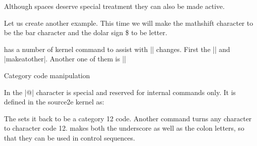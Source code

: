 Although spaces deserve special treatment they can also be made active.


Let us create another example. This time we will make the mathshift character to be the bar {\textbar} character and the dolar sign \$ to be letter.


\latexe has a number of kernel command to assist with |\catcode| changes.  First the |\makeatletter| and |makeatother|. Another one of them is |\@sanitize|

\begin{texexample}{Category code manipulation}{}
\bgroup
\def\@makeother#1{\catcode`#1=12\relax}
\makeatletter
\def\test{\@relax }

\def \@onelevel@sanitize #1{
   \edef #1{\expandafter\strip@prefix
      \meaning #1}
 }

 \@onelevel@sanitize\test
 \test
 
 \makeatother
\egroup 
\end{texexample}

In \latex the |@| character is special and reserved for internal commands only. It is defined in the source2e kernel as:

\begin{teXXX}
\def\makeatletter{\catcode`\@11\relax}
\def\makeatother{\catcode`\@12\relax}
\end{teXXX}


The \CMDI{\makeatother} sets it back to be a category 12 code.   Another command \CMDI{\@makeother} turns any character to character code 12.  makes both the underscore as well as the colon letters, so that they can be used in control sequences.













